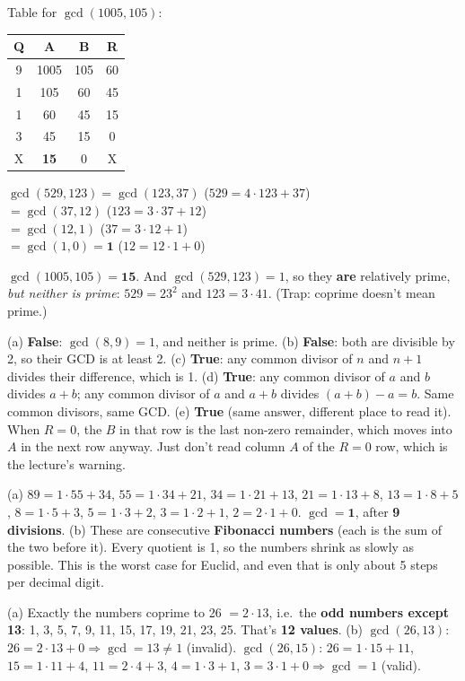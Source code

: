 \ans Table for $\gcd(1005, 105)$:
\begin{center}\small
\begin{tabular}{cccc}
\toprule Q&A&B&R\\\midrule 9&1005&105&60\\ 1&105&60&45\\ 1&60&45&15\\ 3&45&15&0\\ X&\textbf{15}&0&X\\\bottomrule
\end{tabular}
\qquad
\begin{minipage}{0.5\textwidth}
$\gcd(529, 123) = \gcd(123, 37)$ \;($529 = 4\cdot123 + 37$)\\
$= \gcd(37, 12)$ \;($123 = 3\cdot37 + 12$)\\
$= \gcd(12, 1)$ \;($37 = 3\cdot12 + 1$)\\
$= \gcd(1, 0) = \mathbf{1}$ \;($12 = 12\cdot1 + 0$)
\end{minipage}
\end{center}
$\gcd(1005, 105) = \mathbf{15}$. And $\gcd(529, 123) = 1$, so they \textbf{are} relatively prime, \emph{but neither is prime}: $529 = 23^2$ and $123 = 3\cdot41$. (Trap: coprime doesn't mean prime.)

\ans (a) \textbf{False}: $\gcd(8, 9) = 1$, and neither is prime.
(b) \textbf{False}: both are divisible by 2, so their GCD is at least 2.
(c) \textbf{True}: any common divisor of $n$ and $n+1$ divides their difference, which is 1.
(d) \textbf{True}: any common divisor of $a$ and $b$ divides $a + b$; any common divisor of $a$ and $a + b$ divides $(a + b) - a = b$. Same common divisors, same GCD.
(e) \textbf{True} (same answer, different place to read it). When $R = 0$, the $B$ in that row is the last non-zero remainder, which moves into $A$ in the next row anyway. Just don't read column $A$ of the $R = 0$ row, which is the lecture's warning.

\ans (a) $89 = 1\cdot55 + 34$, $55 = 1\cdot34 + 21$, $34 = 1\cdot21 + 13$, $21 = 1\cdot13 + 8$, $13 = 1\cdot8 + 5$, $8 = 1\cdot5 + 3$, $5 = 1\cdot3 + 2$, $3 = 1\cdot2 + 1$, $2 = 2\cdot1 + 0$.
$\gcd = \mathbf{1}$, after \textbf{9 divisions}.
(b) These are consecutive \textbf{Fibonacci numbers} (each is the sum of the two before it). Every quotient is 1, so the numbers shrink as slowly as possible. This is the worst case for Euclid, and even that is only about 5 steps per decimal digit.

\ans (a) Exactly the numbers coprime to 26 $= 2\cdot13$, i.e.\ the \textbf{odd numbers except 13}: 1, 3, 5, 7, 9, 11, 15, 17, 19, 21, 23, 25. That's \textbf{12 values}.
(b) $\gcd(26, 13)$: $26 = 2\cdot13 + 0 \Rightarrow \gcd = 13 \ne 1$ (invalid).
$\gcd(26, 15)$: $26 = 1\cdot15 + 11$, $15 = 1\cdot11 + 4$, $11 = 2\cdot4 + 3$, $4 = 1\cdot3 + 1$, $3 = 3\cdot1 + 0 \Rightarrow \gcd = 1$ (valid).

